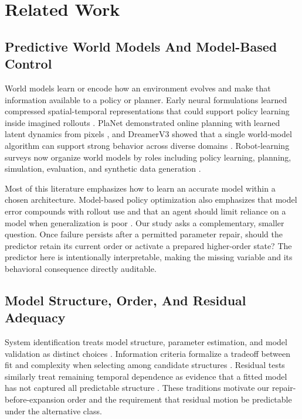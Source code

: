 \documentclass[10pt]{article}
\begin{document}
\section{Related Work}

\subsection{Predictive World Models And Model-Based Control}

World models learn or encode how an environment evolves and make that information available to a policy or planner. Early neural formulations learned compressed spatial-temporal representations that could support policy learning inside imagined rollouts \cite{ha2018world}. PlaNet demonstrated online planning with learned latent dynamics from pixels \cite{hafner2019planet}, and DreamerV3 showed that a single world-model algorithm can support strong behavior across diverse domains \cite{hafner2025dreamerv3}. Robot-learning surveys now organize world models by roles including policy learning, planning, simulation, evaluation, and synthetic data generation \cite{hou2026survey}.

Most of this literature emphasizes how to learn an accurate model within a chosen architecture. Model-based policy optimization also emphasizes that model error compounds with rollout use and that an agent should limit reliance on a model when generalization is poor \cite{janner2019mbpo}. Our study asks a complementary, smaller question. Once failure persists after a permitted parameter repair, should the predictor retain its current order or activate a prepared higher-order state? The predictor here is intentionally interpretable, making the missing variable and its behavioral consequence directly auditable.

\subsection{Model Structure, Order, And Residual Adequacy}

System identification treats model structure, parameter estimation, and model validation as distinct choices \cite{ljung1999system}. Information criteria formalize a tradeoff between fit and complexity when selecting among candidate structures \cite{akaike1974identification}. Residual tests similarly treat remaining temporal dependence as evidence that a fitted model has not captured all predictable structure \cite{ljung1978lack}. These traditions motivate our repair-before-expansion order and the requirement that residual motion be predictable under the alternative class.
\end{document}
